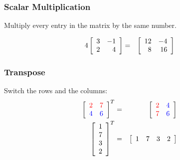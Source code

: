 \begin{frame}
  \frametitle{Scalar Multiplication}

  Multiply every entry in the matrix by the same number.

  \begin{eqnarray*}
    4 \left[ \begin{array}{rr} 3 & -1 \\ 2 & 4 \end{array} \right] & = & \left[ \begin{array}{rr} 12 & -4 \\ 8 & 16 \end{array} \right]
  \end{eqnarray*}


\end{frame}


\begin{frame}
  \frametitle{Transpose}

  Switch the rows and the columns:
  \begin{eqnarray*}
    \left[ \begin{array}{rr} {\color{red}2} & {\color{red}7} \\ {\color{blue}4} & {\color{blue}6} \end{array} \right]^T & = & 
      \left[ \begin{array}{rr} {\color{red}2} & {\color{blue}4} \\ {\color{red}7} & {\color{blue}6} \end{array} \right] \\
    \left[
    \begin{array}{r}
      1 \\ 7 \\ 3 \\ 2
    \end{array}
    \right]^T & = & 
    \left[
    \begin{array}{rrrr}
      1 & 7 & 3 & 2
    \end{array}
    \right]
  \end{eqnarray*}

\end{frame}


